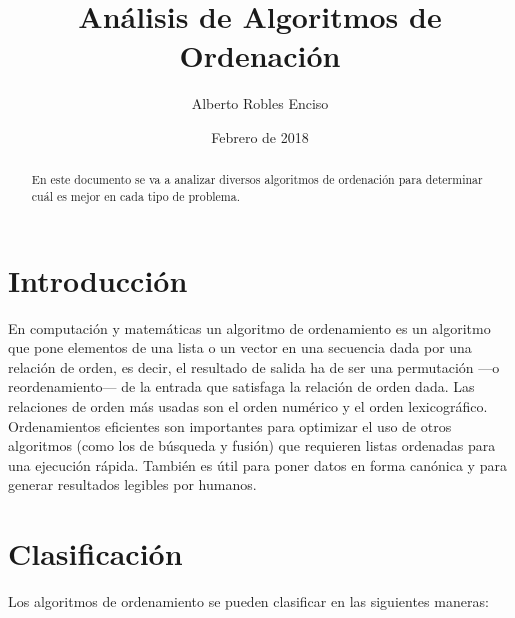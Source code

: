 \documentclass[8pt, A4]{article}    %
\title{Análisis de Algoritmos de Ordenación}
\author{Alberto Robles Enciso}
\date{Febrero de 2018}
\begin{document}
\maketitle

\begin{abstract}
En este documento se va a analizar diversos algoritmos de ordenación para determinar cuál es mejor en cada tipo de problema.
\end{abstract}


\tableofcontents

\newpage

\section{Introducción}
En computación y matemáticas un algoritmo de ordenamiento es un algoritmo que pone elementos de una lista o un vector en una secuencia dada por una relación de orden, es decir, el resultado de salida ha de ser una permutación —o reordenamiento— de la entrada que satisfaga la relación de orden dada. Las relaciones de orden más usadas son el orden numérico y el orden lexicográfico. Ordenamientos eficientes son importantes para optimizar el uso de otros algoritmos (como los de búsqueda y fusión) que requieren listas ordenadas para una ejecución rápida. También es útil para poner datos en forma canónica y para generar resultados legibles por humanos.

\section{Clasificación}
Los algoritmos de ordenamiento se pueden clasificar en las siguientes maneras:
\end{document}
